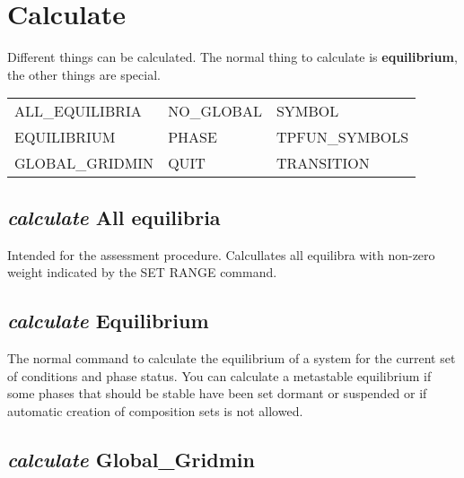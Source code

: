 \documentclass[12pt]{article}
\begin{document}
\section{Calculate }

Different things can be calculated.  The normal thing to calculate is
{\bf equilibrium}, the other things are special.

\begin{tabular}{lll}
 ALL\_EQUILIBRIA &  NO\_GLOBAL  &      SYMBOL\\
 EQUILIBRIUM    &  PHASE     &      TPFUN\_SYMBOLS\\
 GLOBAL\_GRIDMIN & QUIT       &     TRANSITION\\
\end{tabular}
\subsection{{\em calculate} All equilibria}

Intended for the assessment procedure.  Calcullates all equilibra with
non-zero weight indicated by the SET RANGE command.

\subsection{{\em calculate} Equilibrium}

The normal command to calculate the equilibrium of a system for the
current set of conditions and phase status.  You can calculate a
metastable equilibrium if some phases that should be stable have been
set dormant or suspended or if automatic creation of composition sets
is not allowed.

\subsection{{\em calculate} Global\_Gridmin}
\end{document}
